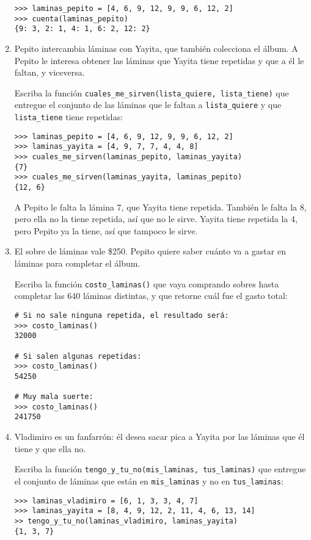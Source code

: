 \begin{enumerate}
\begin{lstlisting}
>>> laminas_pepito = [4, 6, 9, 12, 9, 9, 6, 12, 2]
>>> cuenta(laminas_pepito)
{9: 3, 2: 1, 4: 1, 6: 2, 12: 2}
\end{lstlisting}
\item
  Pepito intercambia láminas con Yayita, que también colecciona el
  álbum. A Pepito le interesa obtener las láminas que Yayita tiene
  repetidas y que a él le faltan, y viceversa.

  Escriba la función
  \lstinline!cuales_me_sirven(lista_quiere, lista_tiene)! que entregue
  el conjunto de las láminas que le faltan a \lstinline!lista_quiere! y
  que \lstinline!lista_tiene! tiene repetidas:

\begin{lstlisting}
>>> laminas_pepito = [4, 6, 9, 12, 9, 9, 6, 12, 2]
>>> laminas_yayita = [4, 9, 7, 7, 4, 4, 8]
>>> cuales_me_sirven(laminas_pepito, laminas_yayita)
{7}
>>> cuales_me_sirven(laminas_yayita, laminas_pepito)
{12, 6}
\end{lstlisting}

  A Pepito le falta la lámina 7, que Yayita tiene repetida. También le
  falta la 8, pero ella no la tiene repetida, así que no le sirve.
  Yayita tiene repetida la 4, pero Pepito ya la tiene, así que tampoco
  le sirve.
\item
  El sobre de láminas vale \$250. Pepito quiere saber cuánto va a gastar
  en láminas para completar el álbum.

  Escriba la función \lstinline!costo_laminas()! que vaya comprando
  sobres hasta completar las 640 láminas distintas, y que retorne cuál
  fue el gasto total:

\begin{lstlisting}
# Si no sale ninguna repetida, el resultado será:
>>> costo_laminas()
32000

# Si salen algunas repetidas:
>>> costo_laminas()
54250

# Muy mala suerte:
>>> costo_laminas()
241750
\end{lstlisting}
\item
  Vladimiro es un fanfarrón: él desea sacar pica a Yayita por las
  láminas que él tiene y que ella no.

  Escriba la función \lstinline!tengo_y_tu_no(mis_laminas, tus_laminas)!
  que entregue el conjunto de láminas que están en
  \lstinline!mis_laminas! y no en \lstinline!tus_laminas!:

\begin{lstlisting}
>>> laminas_vladimiro = [6, 1, 3, 3, 4, 7]
>>> laminas_yayita = [8, 4, 9, 12, 2, 11, 4, 6, 13, 14]
>> tengo_y_tu_no(laminas_vladimiro, laminas_yayita)
{1, 3, 7}
\end{lstlisting}
\end{enumerate}
